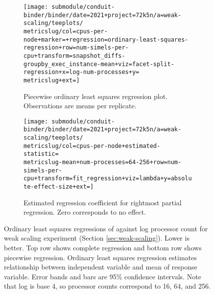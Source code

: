 \begin{figure*}
  \begin{subfigure}[b]{0.5\textwidth}
    \centering
    \texttt{[image: submodule/conduit-binder/binder/date=2021+project=72k5n/a=weak-scaling/teeplots/\\metricslug/col=cpus-per-node+marker=+regression=ordinary-least-squares-regression+row=num-simels-per-cpu+transform=snapshot\_diffs-groupby\_exec\_instance-mean+viz=facet-split-regression+x=log-num-processes+y=\\metricslug+ext=]}
    \caption{
      Piecewise ordinary least squares regression plot.
      Observations are means per replicate.
    }
    \label{fig:weak-scaling-regression-ols-\metricslug-partial-regression}
  \end{subfigure}%
  \begin{subfigure}[b]{0.5\textwidth}
    \centering
    \texttt{[image: submodule/conduit-binder/binder/date=2021+project=72k5n/a=weak-scaling/teeplots/\\metricslug/col=cpus-per-node+estimated-statistic=\\metricslug-mean+num-processes=64-256+row=num-simels-per-cpu+transform=fit\_regression+viz=lambda+y=absolute-effect-size+ext=]}
    \caption{Estimated regression coefficient for rightmost partial regression. Zero corresponds to no effect.}
    \label{fig:weak-scaling-regression-ols-\metricslug-partial-effect-size}
  \end{subfigure}
  \caption{
  Ordinary least squares regressions of \metric{} against log processor count for weak scaling experiment (Section \ref{sec:weak-scaling}).
  Lower is better.
  Top row shows complete regression and bottom row shows piecewise regression.
  Ordinary least squares regression estimates relationship between independent variable and mean of response variable.
  Error bands and bars are 95\% confidence intervals.
  Note that log is base 4, so processor counts correspond to 16, 64, and 256.
  }
  \label{fig:weak-scaling-regression-ols-\metricslug}
\end{figure*}

